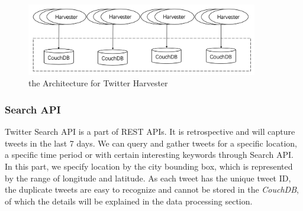 \documentclass{article}
\begin{document}
\begin{figure}[htp]
\centering
\includegraphics[width=0.9\textwidth]{img/harvester_architecture.jpg}
\caption{the Architecture for Twitter Harvester}
\label{fig:harvester_architecture}
\end{figure}

\subsubsection{Search API}
Twitter Search API is a part of REST APIs. It is retrospective and will capture tweets in the last 7 days. We can query and gather tweets for a specific location, a specific time period or with certain interesting keywords through Search API. In this part, we specify location by the city bounding box, which is represented by the range of longitude and latitude. As each tweet has the unique tweet ID, the duplicate tweets are easy to recognize and cannot be stored in the \textit{CouchDB}, of which the details will be explained in the data processing section.
\end{document}
